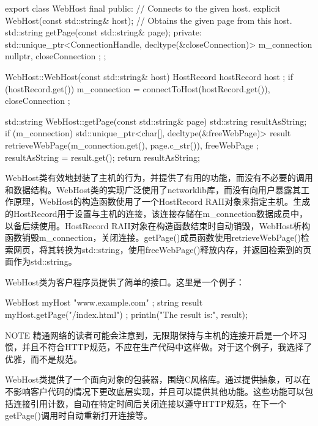 \begin{cpp}
export class WebHost final
{
    public:
        // Connects to the given host.
        explicit WebHost(const std::string& host);
        // Obtains the given page from this host.
        std::string getPage(const std::string& page);
    private:
        std::unique_ptr<ConnectionHandle, decltype(&closeConnection)> m_connection
            { nullptr, closeConnection };
};

WebHost::WebHost(const std::string& host)
{
    HostRecord hostRecord { host };
    if (hostRecord.get()) {
        m_connection = { connectToHost(hostRecord.get()), closeConnection };
    }
}

std::string WebHost::getPage(const std::string& page)
{
    std::string resultAsString;
    if (m_connection) {
        std::unique_ptr<char[], decltype(&freeWebPage)> result {
            retrieveWebPage(m_connection.get(), page.c_str()),
            freeWebPage };
        resultAsString = result.get();
    }
    return resultAsString;
}
\end{cpp}

WebHost类有效地封装了主机的行为，并提供了有用的功能，而没有不必要的调用和数据结构。WebHost类的实现广泛使用了networklib库，而没有向用户暴露其工作原理，WebHost的构造函数使用了一个HostRecord RAII对象来指定主机。生成的HostRecord用于设置与主机的连接，该连接存储在m\_connection数据成员中，以备后续使用。HostRecord RAII对象在构造函数结束时自动销毁，WebHost析构函数销毁m\_connection，关闭连接。getPage()成员函数使用retrieveWebPage()检索网页，将其转换为std::string，使用freeWebPage()释放内存，并返回检索到的页面作为std::string。

WebHost类为客户程序员提供了简单的接口。这里是一个例子：

\begin{cpp}
WebHost myHost { "www.example.com" };
string result { myHost.getPage("/index.html") };
println("The result is:\n{}", result);
\end{cpp}

\begin{myNotic}{NOTE}
精通网络的读者可能会注意到，无限期保持与主机的连接开启是一个坏习惯，并且不符合HTTP规范，不应在生产代码中这样做。对于这个例子，我选择了优雅，而不是规范。
\end{myNotic}

WebHost类提供了一个面向对象的包装器，围绕C风格库。通过提供抽象，可以在不影响客户代码的情况下更改底层实现，并且可以提供其他功能。这些功能可以包括连接引用计数，自动在特定时间后关闭连接以遵守HTTP规范，在下一个getPage()调用时自动重新打开连接等。


